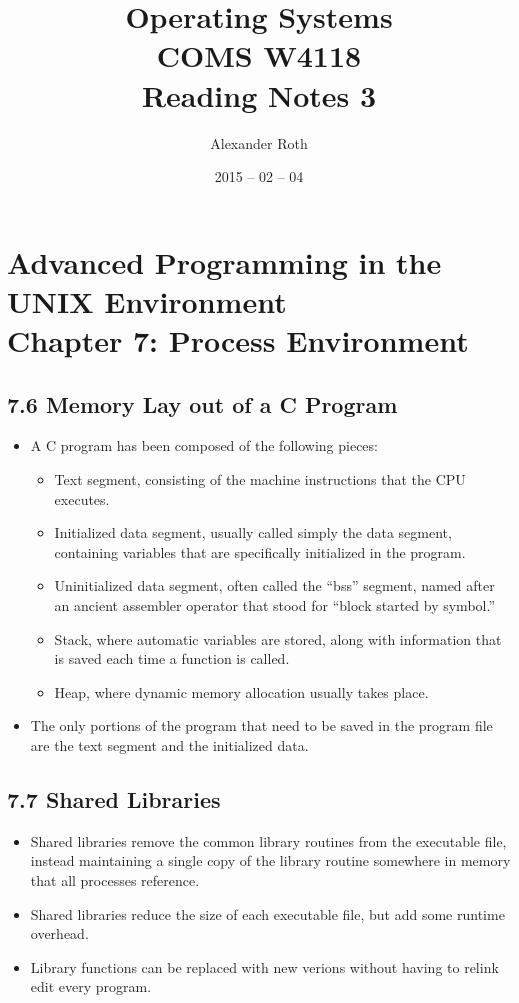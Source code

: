 \documentclass[]{article}
\begin{document}
\newtheorem{thm}{Theorem}
\title{Operating Systems \\ COMS W4118 \\ Reading Notes 3}
\author{Alexander Roth}
\date{2015 -- 02 -- 04}
\maketitle

\section*{Advanced Programming in the UNIX Environment \\
Chapter 7: Process Environment}
\subsection*{7.6 Memory Lay out of a C Program}
\begin{itemize}
\item A C program has been composed of the following pieces:
\begin{itemize}
\item Text segment, consisting of the machine instructions that the CPU
executes.
\item Initialized data segment, usually called simply the data segment,
containing variables that are specifically initialized in the program.
\item Uninitialized data segment, often called the ``bss'' segment, named after
an ancient assembler operator that stood for ``block started by symbol.''
\item Stack, where automatic variables are stored, along with information that
is saved each time a function is called.
\item Heap, where dynamic memory allocation usually takes place.
\end{itemize}
\item The only portions of the program that need to be saved in the program file
are the text segment and the initialized data.
\end{itemize}

\subsection*{7.7 Shared Libraries}
\begin{itemize}
\item Shared libraries remove the common library routines from the executable
file, instead maintaining a single copy of the library routine somewhere in
memory that all processes reference.
\item Shared libraries reduce the size of each executable file, but add some
runtime overhead.
\item Library functions can be replaced with new verions without having to
relink edit every program.
\end{itemize}
\end{document}
